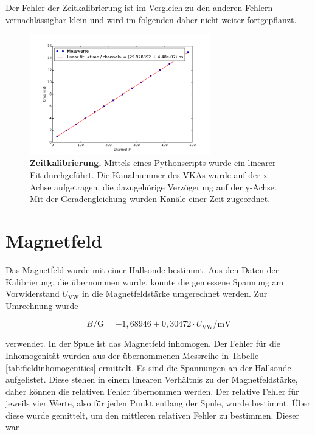 \documentclass[a4paper,ngerman]{scrartcl}
\begin{document}
Der Fehler der Zeitkalibrierung ist im Vergleich zu den anderen
Fehlern vernachlässigbar klein und wird im folgenden daher nicht
weiter fortgepflanzt.

\begin{figure}[tb!]
\centering
\includegraphics[width=0.7\textwidth]{abbildungen/zeitkalibrierung.pdf}
\caption[Zeitkalibrierung]{\textbf{Zeitkalibrierung.} Mittels eines Pythonscripts wurde ein linearer Fit durchgeführt. Die Kanalnummer des VKAs wurde auf der x-Achse aufgetragen, die dazugehörige Verzögerung auf der y-Achse. Mit der Geradengleichung wurden Kanäle einer Zeit zugeordnet.}
\label{fig:zeitkalibrierung}
\end{figure}





\section{Magnetfeld}

Das Magnetfeld wurde mit einer Hallsonde bestimmt. Aus den Daten der Kalibrierung, die übernommen wurde, konnte die gemessene Spannung am Vorwiderstand $U_{\mathrm{VW}}$ in die Magnetfeldstärke umgerechnet werden. Zur Umrechnung wurde 

\begin{equation}
\label{eqn:B-gauss}
B \mathrm{/G} = -1,68946 + 0,30472 \cdot U_{\mathrm{VW}} \mathrm{/mV}
\end{equation}

verwendet. In der Spule ist das Magnetfeld inhomogen. Der Fehler für die Inhomogenität wurden aus der übernommenen Messreihe in Tabelle \ref{tab:fieldinhomogenities} ermittelt. Es sind die Spannungen an der Hallsonde aufgelistet. Diese stehen in einem linearen Verhältnis zu der Magnetfeldstärke, daher können die relativen Fehler übernommen werden. Der relative Fehler für jeweils vier Werte, also für jeden Punkt entlang der Spule, wurde bestimmt. Über diese wurde gemittelt, um den mittleren relativen Fehler zu bestimmen. Dieser war
\end{document}
